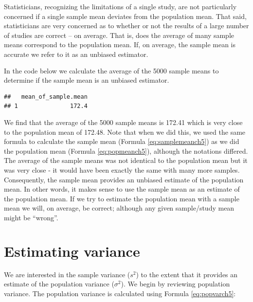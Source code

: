\documentclass[
]{krantz}
\makeatletter
\newenvironment{Shaded}{\begin{snugshade}}{\end{snugshade}}
\newcommand{\DataTypeTok}[1]{\textcolor[rgb]{0.27,0.27,0.27}{#1}}
\newcommand{\KeywordTok}[1]{\textcolor[rgb]{0.27,0.27,0.27}{\textbf{#1}}}
\newcommand{\NormalTok}[1]{#1}
\newcommand{\OperatorTok}[1]{\textcolor[rgb]{0.43,0.43,0.43}{\textbf{#1}}}
\newcommand{\StringTok}[1]{\textcolor[rgb]{0.5,0.5,0.5}{#1}}
\newenvironment{kframe}{%
\medskip{}
\setlength{\fboxsep}{.8em}
 \def\at@end@of@kframe{}%
 \ifinner\ifhmode%
  \def\at@end@of@kframe{\end{minipage}}%
  \begin{minipage}{\columnwidth}%
 \fi\fi%
 \def\FrameCommand##1{\hskip\@totalleftmargin \hskip-\fboxsep
 \colorbox{shadecolor}{##1}\hskip-\fboxsep
     \hskip-\linewidth \hskip-\@totalleftmargin \hskip\columnwidth}%
 \MakeFramed {\advance\hsize-\width
   \@totalleftmargin\z@ \linewidth\hsize
   \@setminipage}}%
 {\par\unskip\endMakeFramed%
 \at@end@of@kframe}
\renewenvironment{Shaded}{\begin{kframe}}{\end{kframe}}
\makeatother
\begin{document}
Statisticians, recognizing the limitations of a single study, are not particularly concerned if a single sample mean deviates from the population mean. That said, statisticians are very concerned as to whether or not the results of a large number of studies are correct -- on average. That is, does the average of many sample means correspond to the population mean. If, on average, the sample mean is accurate we refer to it as an unbiased estimator.

In the code below we calculate the average of the 5000 sample means to determine if the sample mean is an unbiased estimator.

\begin{Shaded}
\end{Shaded}

\begin{verbatim}
##   mean_of_sample.mean
## 1               172.4
\end{verbatim}

We find that the average of the 5000 sample means is 172.41 which is very close to the population mean of 172.48. Note that when we did this, we used the same formula to calculate the sample mean (Formula \eqref{eq:samplemeanch5}) as we did the population mean (Formula \eqref{eq:popmeanch5}), although the notations differed. The average of the sample means was not identical to the population mean but it was very close - it would have been exactly the same with many more samples. Consequently, the sample mean provides an unbiased estimate of the population mean. In other words, it makes sense to use the sample mean as an estimate of the population mean. If we try to estimate the population mean with a sample mean we will, on average, be correct; although any given sample/study mean might be ``wrong''.

\hypertarget{estimating-variance}{%
\section{Estimating variance}\label{estimating-variance}}

We are interested in the sample variance (\(s^2\)) to the extent that it provides an estimate of the population variance (\(\sigma^2\)). We begin by reviewing population variance. The population variance is calculated using Formula \eqref{eq:popvarch5}:
\end{document}
